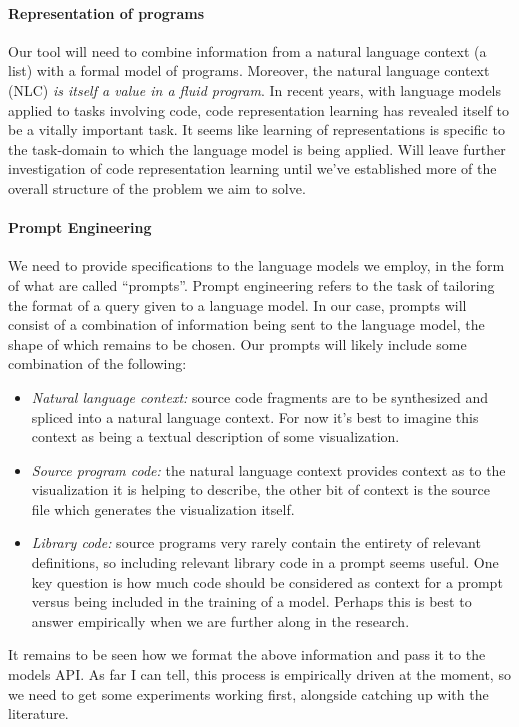 \paragraph*{Representation of  programs}
Our tool will need to combine information from a natural language context (a  list)
with a formal model of  programs. Moreover, the natural language context (NLC)
\textit{is itself a value in a fluid program}. In recent years, with language models applied to tasks
involving code, code representation learning has revealed itself to be a vitally important task.
It seems like learning of representations is specific to the task-domain to which the language model
is being applied. Will leave further investigation of code representation learning until we've 
established more of the overall structure of the problem we aim to solve.

\paragraph*{Prompt Engineering}
We need to provide specifications to the language models we employ, in the form of what are called
``prompts''. Prompt engineering refers to the task of tailoring the format of a query given to a 
language model. In our case, prompts will consist of a combination of information being sent to the
language model, the shape of which remains to be chosen.
Our prompts will likely include some combination of the following:
\begin{itemize}
   \item \textit{Natural language context:} source code fragments are to be synthesized and spliced into a natural language context. For now it's best to imagine this context as being a textual description of some visualization.
   \item \textit{Source program code:} the natural language context provides context as to the visualization it is helping to describe, the other bit of context is the source file which generates the visualization itself.
   \item \textit{Library code:} source programs very rarely contain the entirety of relevant definitions, so including relevant library code in a prompt seems useful. One key question is how much code should be considered as context for a prompt versus being included in the training of a model. Perhaps this is best to answer empirically when we are further along in the research.
\end{itemize}

It remains to be seen how we format the above information and pass it to the models API.
As far I can tell, this process is empirically driven at the moment, so we need
to get some experiments working first, alongside catching up with the literature.